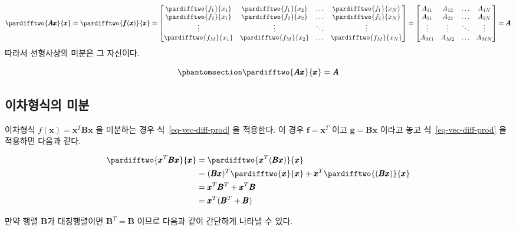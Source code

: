 \documentclass[
  11pt,
  a4paper,
  oneside]{scrbook}
\theoremstyle{definition}
\theoremstyle{definition}
\theoremstyle{plain}
\theoremstyle{remark}
\begin{document}
\[
\pardifftwo{\pmb A \pmb x}{\pmb x}   = \pardifftwo{\pmb f (\pmb x)}{\pmb x} =
\begin{bmatrix}
\pardifftwo{f_1}{x_1} & \pardifftwo{f_1}{x_2} & \dots & \pardifftwo{f_1}{x_N} \\
\pardifftwo{f_2}{x_1} & \pardifftwo{f_2}{x_2} & \dots & \pardifftwo{f_2}{x_N} \\
\vdots & \vdots & \ddots & \vdots \\
\pardifftwo{f_M}{x_1} & \pardifftwo{f_M}{x_2} & \dots & \pardifftwo{f_M}{x_N} \\
\end{bmatrix} =
\begin{bmatrix}
A_{11} & A_{12} & \dots & A_{1N} \\
A_{21} & A_{22} & \dots & A_{2N} \\
\vdots & \vdots & \ddots & \vdots \\
A_{M1} & A_{M2} & \dots & A_{MN} \\
\end{bmatrix} = \pmb A
\] 따라서 선형사상의 미분은 그 자신이다.

\begin{equation}\phantomsection\label{eq-vec-diff-linear}{ \pardifftwo{\pmb A \pmb x}{\pmb x}  = \pmb A }\end{equation}

\subsection{이차형식의
미분}\label{uxc774uxcc28uxd615uxc2dduxc758-uxbbf8uxbd84}

이차형식 \(f(\pmb x) = \pmb x^T \pmb B \pmb x\) 을 미분하는 경우
식~\ref{eq-vec-diff-prod} 을 적용한다. 이 경우 \(\pmb f= \pmb x^T\) 이고
\(\pmb g = \pmb B \pmb x\) 이라고 놓고 식~\ref{eq-vec-diff-prod} 을
적용하면 다음과 같다.

\[
\begin{aligned}
\pardifftwo{\pmb x^T \pmb B \pmb x}{\pmb x} & = 
\pardifftwo{\pmb x^T (\pmb B \pmb x)}{\pmb x} \\
& =  (\pmb B \pmb x)^T \pardifftwo{ \pmb x}{\pmb x}  + 
\pmb x^T \pardifftwo{ (\pmb B \pmb x)}{\pmb x} \\
& =  \pmb x^T \pmb B^T  +  \pmb x^T \pmb B \\
& = \pmb x^T (\pmb B^T + \pmb B)
\end{aligned}
\]

만약 행렬 \(\pmb B\)가 대칭행렬이면 \(\pmb B^T = \pmb B\) 이므로 다음과
같이 간단하게 나타낼 수 있다.
\end{document}
